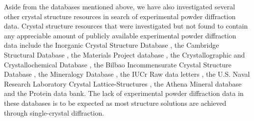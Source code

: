 Aside from the databases mentioned above, we have also investigated several other crystal structure resources in search of experimental powder diffraction data. Crystal structure resources that were investigated but not found to contain any appreciable amount of publicly available experimental powder diffraction data include the Inorganic Crystal Structure Database \cite{ICSDWeb}, the Cambridge Structural Database \cite{CambridgeWeb}, the Materials Project database \cite{MatProjWeb}, the Crystallographic and Crystallochemical Database \cite{CrystallochemicalWeb}, the Bilbao Incommensurate Crystal Structure Database \cite{BilbaoWeb}, the Mineralogy Database \cite{MineralogyWeb}, the IUCr Raw data letters \cite{IUCrWeb}, the U.S. Naval Research Laboratory Crystal Lattice-Structures \cite{NRLWeb}, the Athena Mineral database \cite{AthenaWeb} and the Protein data bank\cite{PDBWeb}. The lack of experimental powder diffraction data in these databases is to be expected as most structure solutions are achieved through single-crystal diffraction.